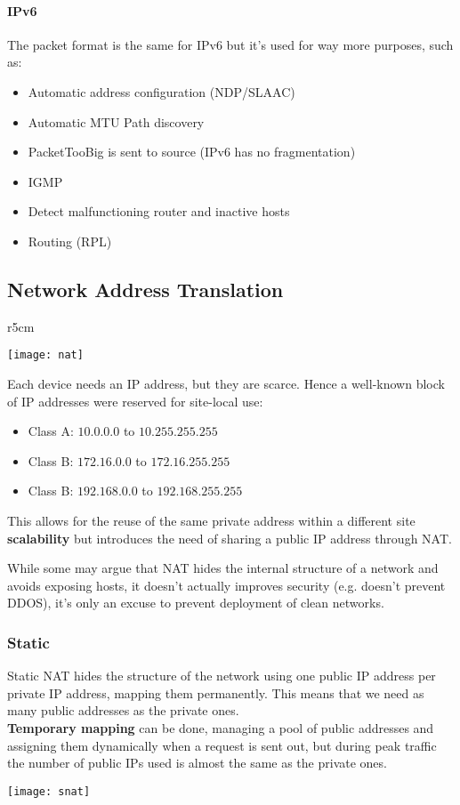 \paragraph{IPv6} The packet format is the same for IPv6 but it's used for way more purposes, such as:
\begin{itemize}
	\item Automatic address configuration (NDP/SLAAC)
	\item Automatic MTU Path discovery
	\item PacketTooBig is sent to source (IPv6 has no fragmentation)
	\item IGMP
	\item Detect malfunctioning router and inactive hosts
	\item Routing (RPL)
\end{itemize}

\subsection{Network Address Translation}
\begin{wrapfigure}[5]{r}{5cm}
	\vspace{-0.5cm}
	\begin{center}
		\texttt{[image: nat]}
	\end{center}
\end{wrapfigure}
Each device needs an IP address, but they are scarce. Hence a well-known block of IP addresses were reserved for site-local use:
\begin{itemize}
	\item Class A: $10.0.0.0$ to $10.255.255.255$
	\item Class B: $172.16.0.0$ to $172.16.255.255$
	\item Class B: $192.168.0.0$ to $192.168.255.255$
\end{itemize}
This allows for the reuse of the same private address within a different site \textbf{scalability} but introduces the need of sharing a public IP address through NAT.

\begin{observation}[Security]
	While some may argue that NAT hides the internal structure of a network and avoids exposing hosts, it doesn't actually improves security (e.g. doesn't prevent DDOS), it's only an excuse to prevent deployment of clean networks.
\end{observation}

\subsubsection{Static}
Static NAT hides the structure of the network using one public IP address per private IP address, mapping them permanently. This means that we need as many public addresses as the private ones.\\
\textbf{Temporary mapping} can be done, managing a pool of public addresses and assigning them dynamically when a request is sent out, but during peak traffic the number of public IPs used is almost the same as the private ones.
\begin{center}
	\texttt{[image: snat]}
\end{center}

